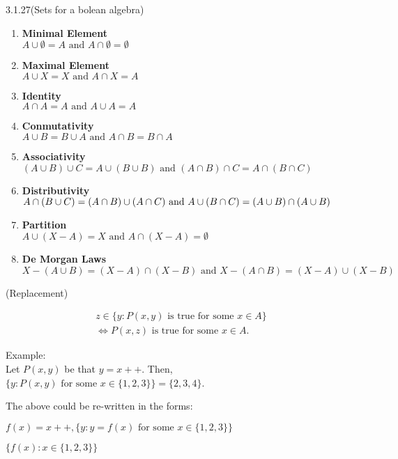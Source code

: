 \documentclass[letterpaper]{article}
\begin{document}
\begin{prbox}{3.1.27}{(Sets for a bolean algebra)}
  \begin{enumerate}[label=\alph*)]
    \item \textbf{Minimal Element}\\
      $A \cup \emptyset = A \text{ and } A \cap \emptyset = \emptyset$ 
    \item \textbf{Maximal Element}\\
      $A \cup X = X \text{ and } A \cap X = A$ 
    \item \textbf{Identity}\\
      $A \cap A = A \text{ and } A \cup A = A$ 
    \item \textbf{Conmutativity}\\
      $A \cup B = B \cup A \text{ and } A \cap B = B \cap A$
    \item \textbf{Associativity}\\
      $(A \cup B) \cup C = A \cup (B \cup B) \text{ and } (A \cap B) \cap C = A \cap (B \cap C)$
    \item \textbf{Distributivity}\\
      $A \cap (B \cup C) = (A \cap B) \cup (A \cap C) \text{ and } \\ A \cup(B \cap C) = (A \cup B) \cap (A \cup B)$
    \item \textbf{Partition}\\
      $A \cup (X - A) = X \text { and } A \cap (X - A) = \emptyset$
    \item \textbf{De Morgan Laws}\\
      $X - (A \cup B) = (X - A) \cap (X - B) \text{ and } X - (A \cap B) = (X - A) \cup (X - B)$
  \end{enumerate}
\end{prbox}

\begin{axbox}{3.7}{(Replacement)}
  \vspace{-1cm}
  \begin{center}
    \begin{multline*}
      z \in \{y: P(x,y) \text{ is true for some } x \in A\} \\
      \iff P(x,z) \text{ is true for some } x \in A.
    \end{multline*}
  \end{center}

  \begin{paragraph}{Example:}~\\
    Let $P(x,y)$ be that $y = x++$. Then, $\{y : P(x,y) \text{ for some } x \in \{1,2,3\}\} = \{2,3,4\}$.
  \end{paragraph}

  \medskip

  The above could be re-written in the forms:

  \hspace{1cm}
  $f(x) = x++, \{y : y = f(x) \text{ for some } x \in \{1,2,3\}\}$
  
  \hspace{1cm}
  $\{f(x) : x \in \{1,2,3\}\}$
    
\end{axbox}
\end{document}
